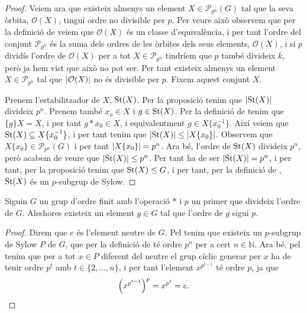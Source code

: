 \documentclass[../Apunts.tex]{subfiles}
\begin{document}
\begin{theorem}
\begin{proof}
			Veiem ara que existeix almenys un element \(X\in\mathcal{P}_{p^{n}}(G)\) tal que la seva òrbita, \(\mathcal{O}(X)\), tingui ordre no divisible per \(p\). Per veure això observem que per la definició de  veiem que \(\mathcal{O}(X)\) és un classe d'equivalència, i per tant l'ordre del conjunt \(\mathcal{P}_{p^{n}}\) és la suma dels ordres de les òrbites dels seus elements, \(\mathcal{O}(X)\), i si \(p\) dividís l'ordre de \(\mathcal{O}(X)\) per a tot \(X\in\mathcal{P}_{p^{n}}\) tindríem que \(p\) també divideix \(k\), però ja hem vist que això no pot ser. Per tant existeix almenys un element \(X\in\mathcal{P}_{p^{n}}\) tal que \(\abs{\mathcal{O}(X)}\) no és divisible per \(p\). Fixem aquest conjunt \(X\).
			
			Prenem l'estabilitzador de \(X\), \(\operatorname{St}(X)\). Per la proposició  tenim que \(\abs{\St(X)}\) divideix \(p^{n}\). Prenem també \(x_{o}\in X\) i \(g\in\operatorname{St}(X)\). Per la definició de  tenim que \(\{g\}X=X\), i per tant \(g\ast x_{0}\in X\), i equivalentment \(g\in X\{x_{0}^{-1}\}\). Així veiem que \(\operatorname{St}(X)\subseteq X\{x_{0}^{-1}\}\), i per tant tenim que \(\abs{\St(X)}\leq\abs{X\{x_{0}\}}\). Observem que \(X\{x_{0}\}\in\mathcal{P}_{p^{n}}(G)\) i per tant \(\abs{X\{x_{0}\}}=p^{n}\). Ara bé, l'ordre de \(\operatorname{St}(X)\) divideix \(p^{n}\), però acabem de veure que \(\abs{\St(X)}\leq p^{n}\). Per tant ha de ser \(\abs{\St(X)}=p^{n}\), i per tant, per la proposició  tenim que \(\operatorname{St}(X)\leq G\), i per tant, per la definició de , \(\operatorname{St}(X)\) és un \(p\)-subgrup de Sylow.
		\end{proof}
	\end{theorem}
	\begin{corollary}
		\label{thm:Teorema de Cauchy per grups}
		Siguin \(G\) un grup d'ordre finit amb l'operació \(\ast\) i \(p\) un primer que divideix l'ordre de \(G\). Aleshores existeix un element \(g\in G\) tal que l'ordre de \(g\) sigui \(p\).
		\begin{proof}
			Direm que \(e\) és l'element neutre de \(G\). Pel  tenim que existeix un \(p\)-subgrup de Sylow \(P\) de \(G\), que per la definició de  té ordre \(p^{n}\) per a cert \(n\in\mathbb{N}\). Ara bé, pel  tenim que per a tot \(x\in P\) diferent del neutre el grup cíclic generar per \(x\) ha de tenir ordre \(p^{t}\) amb \(t\in\{2,\dots,n\}\), i per tant l'element \(x^{p^{t-1}}\) té ordre \(p\), ja que 
			\[\left(x^{p^{t-1}}\right)^{p}=x^{p^{t}}=e.\qedhere\]
		\end{proof}
	\end{corollary}
\end{document}

